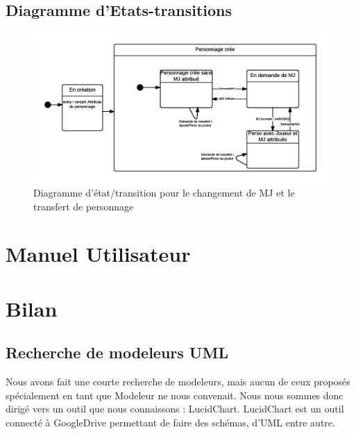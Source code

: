 \documentclass[a4paper,oneside,10pt]{article}
\begin{document}
\subsection{Diagramme d'Etats-transitions}
\begin{figure}[H]
	\begin{center}
		\includegraphics[width=\textwidth]{images/sequence/ET-Personnage.png}  
		\caption{Diagramme d'état/transition pour le changement de MJ et le transfert de personnage}
	\end{center}
\end{figure}

\pagebreak

\section{Manuel Utilisateur}


\pagebreak

\section{Bilan}


\subsection{Recherche de modeleurs UML}

Nous avons fait une courte recherche de modeleurs, mais aucun de ceux proposés spécialement en tant que Modeleur ne nous convenait. Nous nous sommes donc dirigé vers un outil que nous connaissons : LucidChart. LucidChart est un outil connecté à GoogleDrive permettant de faire des schémas, d'UML entre autre. 
\end{document}
